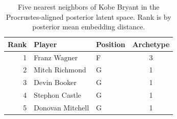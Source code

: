 \begin{table}[htbp]
  \centering\small
  \begin{tabular}{rllc}
    \toprule
    Rank & Player & Position & Archetype \\
    \midrule
    1 & Franz Wagner & F & 3 \\
    2 & Mitch Richmond & G & 1 \\
    3 & Devin Booker & G & 1 \\
    4 & Stephon Castle & G & 1 \\
    5 & Donovan Mitchell & G & 1 \\
    \bottomrule
  \end{tabular}
  \caption{Five nearest neighbors of Kobe Bryant in the Procrustes-aligned posterior latent space. Rank is by posterior mean embedding distance.}
  \label{tab:Kobe_Bryant_neighbors}
\end{table}

